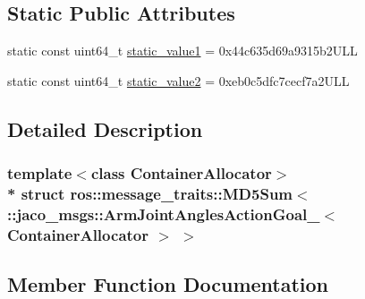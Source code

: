 \subsection*{Static Public Attributes}
\begin{DoxyCompactItemize}
\item 
static const uint64\+\_\+t \hyperlink{structros_1_1message__traits_1_1MD5Sum_3_01_1_1jaco__msgs_1_1ArmJointAnglesActionGoal___3_01ContainerAllocator_01_4_01_4_a82530487efd7b705adb22f01c59c3b2b}{static\+\_\+value1} = 0x44c635d69a9315b2\+U\+LL
\item 
static const uint64\+\_\+t \hyperlink{structros_1_1message__traits_1_1MD5Sum_3_01_1_1jaco__msgs_1_1ArmJointAnglesActionGoal___3_01ContainerAllocator_01_4_01_4_acdfcd4a30fa304c047186e98d84094b9}{static\+\_\+value2} = 0xeb0c5dfc7cecf7a2\+U\+LL
\end{DoxyCompactItemize}


\subsection{Detailed Description}
\subsubsection*{template$<$class Container\+Allocator$>$\\*
struct ros\+::message\+\_\+traits\+::\+M\+D5\+Sum$<$ \+::jaco\+\_\+msgs\+::\+Arm\+Joint\+Angles\+Action\+Goal\+\_\+$<$ Container\+Allocator $>$ $>$}



\subsection{Member Function Documentation}
